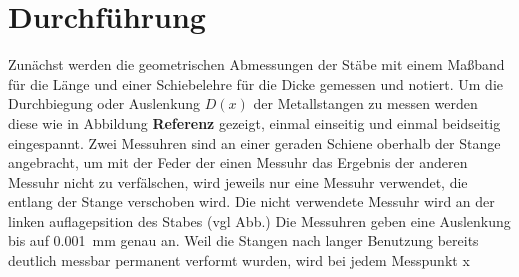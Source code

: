 \section{Durchführung}
Zunächst werden die geometrischen Abmessungen der Stäbe mit einem Maßband für die Länge und einer Schiebelehre für die Dicke
gemessen und notiert.
Um die Durchbiegung oder Auslenkung $D(x)$ der Metallstangen zu messen werden diese wie in Abbildung \textbf{Referenz} gezeigt,
einmal einseitig und einmal beidseitig eingespannt.
Zwei Messuhren sind an einer geraden Schiene oberhalb der Stange angebracht, um mit der Feder der einen Messuhr das Ergebnis der
anderen Messuhr nicht zu verfälschen, wird jeweils nur eine Messuhr verwendet, die entlang der Stange verschoben wird.
Die nicht verwendete Messuhr wird an der linken auflagepsition des Stabes (vgl Abb.)
Die Messuhren geben eine Auslenkung bis auf \qty{0.001}{\milli\meter} genau an.
Weil die Stangen nach langer Benutzung bereits deutlich messbar permanent verformt wurden,
wird bei jedem Messpunkt x 
